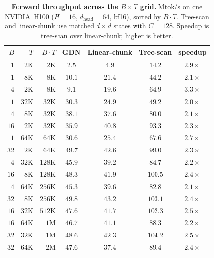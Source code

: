 \documentclass{article}
\newcommand{\1}{\bm{1}}
\newcommand{\seql}{T}
\theoremstyle{definition}
\begin{document}
\begin{table}[htbp]
    \centering\footnotesize
    \caption{\textbf{Forward throughput across the $B\times \seql$ grid.}
    Mtok/s on one NVIDIA~H100 ($H{=}16$, $d_\text{head}{=}64$, bf16), sorted by
    $B\!\cdot\!\seql$. Tree-scan and linear-chunk use matched $d{\times}d$ states with
    $C{=}128$. Speedup is tree-scan over linear-chunk; higher is better.}
    \label{tab:bt-throughput}
    \begin{tabular}{rr|r|ccc|c}
    \toprule
    $B$ & $\seql$ & $B\!\cdot\!\seql$ & GDN & Linear-chunk & Tree-scan & speedup \\
    \midrule
    $1$  & $2$K  & $2$K   & $2.5$  & $4.9$  & $\mathbf{14.2}$  & $2.9\times$ \\
    $1$  & $8$K  & $8$K   & $10.1$ & $21.4$ & $\mathbf{44.2}$  & $2.1\times$ \\
    $4$  & $2$K  & $8$K   & $9.1$  & $19.6$ & $\mathbf{64.9}$  & $3.3\times$ \\
    $1$  & $32$K & $32$K  & $30.3$ & $24.9$ & $\mathbf{49.2}$  & $2.0\times$ \\
    $4$  & $8$K  & $32$K  & $38.1$ & $37.6$ & $\mathbf{80.0}$  & $2.1\times$ \\
    $16$ & $2$K  & $32$K  & $35.9$ & $40.8$ & $\mathbf{93.3}$  & $2.3\times$ \\
    $1$  & $64$K & $64$K  & $30.6$ & $25.4$ & $\mathbf{67.6}$  & $2.7\times$ \\
    $32$ & $2$K  & $64$K  & $49.7$ & $42.6$ & $\mathbf{99.0}$  & $2.3\times$ \\
    $4$  & $32$K & $128$K & $45.9$ & $39.2$ & $\mathbf{84.7}$  & $2.2\times$ \\
    $16$ & $8$K  & $128$K & $48.3$ & $41.9$ & $\mathbf{100.5}$ & $2.4\times$ \\
    $4$  & $64$K & $256$K & $45.3$ & $39.6$ & $\mathbf{82.8}$  & $2.1\times$ \\
    $32$ & $8$K  & $256$K & $49.8$ & $43.2$ & $\mathbf{103.1}$ & $2.4\times$ \\
    $16$ & $32$K & $512$K & $47.6$ & $41.7$ & $\mathbf{102.3}$ & $2.5\times$ \\
    $16$ & $64$K & $1$M   & $46.7$ & $41.1$ & $\mathbf{88.3}$  & $2.2\times$ \\
    $32$ & $32$K & $1$M   & $48.6$ & $42.3$ & $\mathbf{104.2}$ & $2.5\times$ \\
    $32$ & $64$K & $2$M   & $47.6$ & $37.4$ & $\mathbf{89.4}$  & $2.4\times$ \\
    \bottomrule
    \end{tabular}
\end{table}
\end{document}
